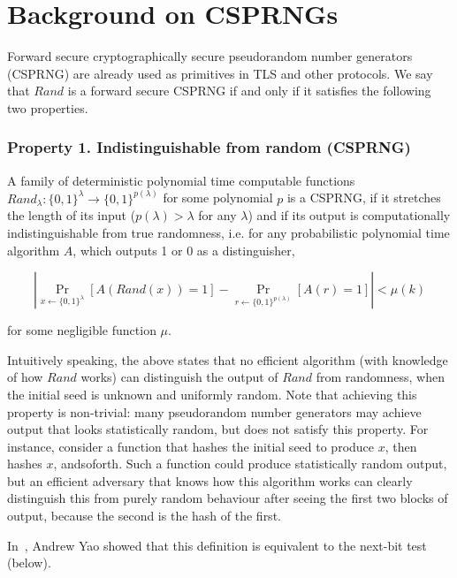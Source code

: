 \documentclass{article}
\begin{document}
\section{Background on CSPRNGs} \label{CSPRNG}
Forward secure cryptographically secure pseudorandom number generators (CSPRNG) are already used as primitives in TLS and other protocols. 
We say that $\mathit{Rand}$ is a forward secure CSPRNG if and only if it satisfies the following two properties.

\subsubsection*{Property 1. Indistinguishable from random (CSPRNG)}

A family of deterministic polynomial time computable functions $Rand_{\lambda}
\colon \{0, 1\}^{\lambda} \rightarrow \{0, 1 \}^{p(\lambda)}$ for some polynomial
$p$ is a CSPRNG, if it stretches the length of its input ($p(\lambda) > \lambda$ for any $\lambda$) and if its output is computationally indistinguishable from true randomness, i.e. for any probabilistic polynomial time algorithm $A$, which outputs 1 or 0 as a distinguisher,

$$ \left \vert \Pr_{x\gets\{0,1\}^\lambda}[A(Rand(x))=1] - \Pr_{r\gets\{0,1\}^{p(\lambda)}}[A(r)=1] \right \vert < \mu(k) $$

\noindent for some negligible function $\mu$.

Intuitively speaking, the above states that no efficient algorithm (with knowledge of how $\mathit{Rand}$ works) can distinguish the output of $\mathit{Rand}$ from randomness, when the initial seed is unknown and uniformly random. Note that achieving this property is non-trivial: many pseudorandom number generators may achieve output that looks statistically random, but does not satisfy this property. For instance, consider a function that hashes the initial seed to produce $x$, then hashes $x$, andsoforth. Such a function could produce statistically random output, but an efficient adversary that knows how this algorithm works can clearly distinguish this from purely random behaviour after seeing the first two blocks of output, because the second is the hash of the first.

In~\cite{Yao1982TheoryAA},
Andrew Yao showed that this definition is equivalent to the next-bit test (below).
\end{document}
